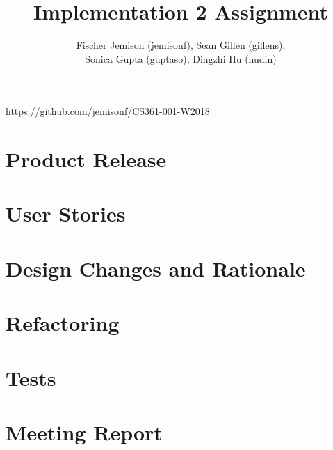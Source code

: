 \documentclass[12pt]{article}
\title{Implementation 2 Assignment}
\author{Fischer Jemison (jemisonf), Sean Gillen (gillens), \\
Sonica Gupta (guptaso), Dingzhi Hu (hudin) }
\begin{document}
\maketitle
\centerline{\url{https://github.com/jemisonf/CS361-001-W2018}}
\tableofcontents

\section{Product Release}
 \section{User Stories}
 \section{Design Changes and Rationale}
 \section{Refactoring}
 \section{Tests}
 \section{Meeting Report}
 
\end{document}
